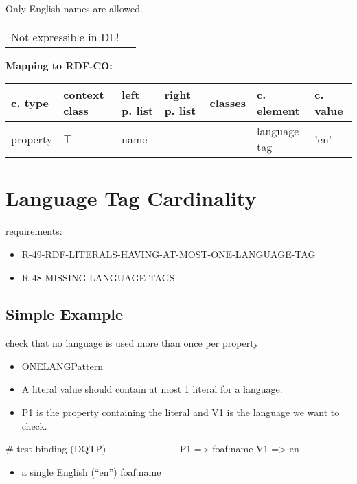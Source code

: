 \documentclass{llncs}
\newenvironment{gcotable}{
  \scriptsize
  \sffamily
  \vspace{0cm}
	\begin{center}
	\textbf{\vspace{0.4cm}Mapping to RDF-CO:} \\
  \begin{tabular}{l|l|l|l|l|l|l}
	\hline
  \textbf{c. type} & \textbf{context class} & \textbf{left p. list} & \textbf{right p. list} & \textbf{classes} & \textbf{c. element} & \textbf{c. value} \\
  \hline

}{
  \hline
  \end{tabular}
	\end{center}
}
\newenvironment{DL}{
  \vspace{0cm}
	\begin{center}
  \begin{tabular}{r l}

}{
  \end{tabular}
	\end{center}
}
\begin{document}
Only English names are allowed.

\begin{DL}
Not expressible in DL!
\end{DL}

\begin{gcotable}
property & $\top$ & name & - & - & language tag & 'en' \\
\end{gcotable}

\section{Language Tag Cardinality}

requirements:

\begin{itemize}
	\item R-49-RDF-LITERALS-HAVING-AT-MOST-ONE-LANGUAGE-TAG
	\item R-48-MISSING-LANGUAGE-TAGS
\end{itemize}

\subsection{Simple Example}

check that no language is used more than once per property


\begin{itemize}
	\item ONELANGPattern \cite{Kontokostas2014} 
  \item A literal value should contain at most 1 literal for a language. 
  \item P1 is the property containing the literal and V1 is the language we want to check.
\end{itemize}

\begin{ex}
# test binding (DQTP)
---------------------
P1 => foaf:name
V1 => en
\end{ex}

\begin{itemize}
	\item a single English (“en”) foaf:name
\end{itemize}
\end{document}
